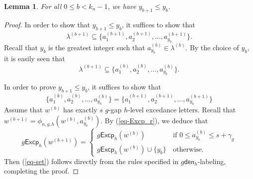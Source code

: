 \documentclass[12pt]{article}
\numberwithin{equation}{section}
\theoremstyle{plain}
\newtheorem{lemma}[theorem]{Lemma}
\def\den{\mathsf{den}}
\def\Excp{\mathsf{Excp}}
\begin{document}
\begin{lemma}\label{lem-y_b}
	For all $0\leq b<k_n-1$, we have $y_{b+1}\leq y_{b}$. 
	\end{lemma}
\begin{proof}
 In order to show that 
$y_{b+1}\leq y_b$, it suffices to show that $$\lambda^{(b+1)}\subseteq \{a^{(b+1)}_{1}, a^{(b+1)}_2, \ldots, a^{(b+1)}_{y_b}\}.$$  Recall that $y_b$ is the greatest integer such that $a^{(b)}_{y_b}\in \lambda^{(b)}$.  By the choice of $y_b$, it is easily seen that
$$
\lambda^{(b+1)} \subseteq \{a^{(b)}_{1}, a^{(b)}_2, \ldots, a^{(b)}_{y_b}\}. 
$$

In order to prove  $y_{b+1}\leq y_b$, it suffices to show that 
\begin{equation}\label{eq-set}
	\{a^{(b)}_{1}, a^{(b)}_2, \ldots, a^{(b)}_{y_b}\}= \{a^{(b+1)}_{1}, a^{(b+1)}_2, \ldots, a^{(b+1)}_{y_b}\}
	\end{equation}
Assume that $w^{(b)}$ has exactly $s$ $g$-gap $h$-level excedance letters.  Recall that    $w^{(b+1)}=\phi_{n, g,h}(w^{(b)}, a^{(b)}_{y_b})$. By (\ref{eq-Excp_r}), we deduce that 
$$
	g\Excp_h(w^{(b+1)})=\left\{ \begin{array}{ll}
		g\Excp_h(w^{(b)})&\, \mathrm{if}\,\,   0\leq a^{(b)}_{y_b}\leq s+\gamma_g  \\
		g\Excp_h(w^{(b)})\cup \{y_b\}&\, \mathrm{otherwise}.
	\end{array}
	\right.
$$
Then  (\ref{eq-set}) follows directly from     the rules specified in $g\den_{h}$-labeling, completing the proof. 
	\end{proof}
\end{document}
